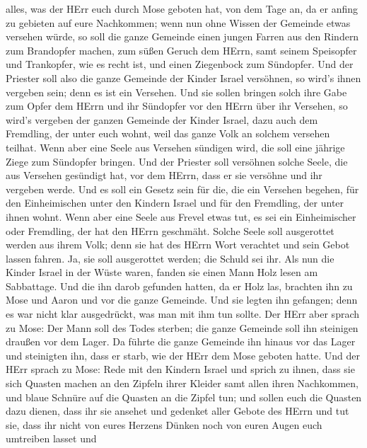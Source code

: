 alles, was der HErr euch durch Mose geboten hat, von dem Tage an, da er
anfing zu gebieten auf eure Nachkommen;  wenn nun ohne
Wissen der Gemeinde etwas versehen würde, so soll die ganze Gemeinde
einen jungen Farren aus den Rindern zum Brandopfer machen, zum süßen
Geruch dem HErrn, samt seinem Speisopfer und Trankopfer, wie es recht
ist, und einen Ziegenbock zum Sündopfer.  Und der Priester
soll also die ganze Gemeinde der Kinder Israel versöhnen, so wird's
ihnen vergeben sein; denn es ist ein Versehen. Und sie sollen bringen
solch ihre Gabe zum Opfer dem HErrn und ihr Sündopfer vor den HErrn über
ihr Versehen,  so wird's vergeben der ganzen Gemeinde der
Kinder Israel, dazu auch dem Fremdling, der unter euch wohnt, weil das
ganze Volk an solchem versehen teilhat.  Wenn aber eine
Seele aus Versehen sündigen wird, die soll eine jährige Ziege zum
Sündopfer bringen.  Und der Priester soll versöhnen solche
Seele, die aus Versehen gesündigt hat, vor dem HErrn, dass er sie
versöhne und ihr vergeben werde.  Und es soll ein Gesetz
sein für die, die ein Versehen begehen, für den Einheimischen unter den
Kindern Israel und für den Fremdling, der unter ihnen wohnt.
 Wenn aber eine Seele aus Frevel etwas tut, es sei ein
Einheimischer oder Fremdling, der hat den HErrn geschmäht. Solche Seele
soll ausgerottet werden aus ihrem Volk;  denn sie hat des
HErrn Wort verachtet und sein Gebot lassen fahren. Ja, sie soll
ausgerottet werden; die Schuld sei ihr.  Als nun die Kinder
Israel in der Wüste waren, fanden sie einen Mann Holz lesen am
Sabbattage.  Und die ihn darob gefunden hatten, da er Holz
las, brachten ihn zu Mose und Aaron und vor die ganze Gemeinde.
 Und sie legten ihn gefangen; denn es war nicht klar
ausgedrückt, was man mit ihm tun sollte.  Der HErr aber
sprach zu Mose: Der Mann soll des Todes sterben; die ganze Gemeinde soll
ihn steinigen draußen vor dem Lager.  Da führte die ganze
Gemeinde ihn hinaus vor das Lager und steinigten ihn, dass er starb, wie
der HErr dem Mose geboten hatte.  Und der HErr sprach zu
Mose:  Rede mit den Kindern Israel und sprich zu ihnen,
dass sie sich Quasten machen an den Zipfeln ihrer Kleider samt allen
ihren Nachkommen, und blaue Schnüre auf die Quasten an die Zipfel tun;
 und sollen euch die Quasten dazu dienen, dass ihr sie
ansehet und gedenket aller Gebote des HErrn und tut sie, dass ihr nicht
von eures Herzens Dünken noch von euren Augen euch umtreiben lasset und
